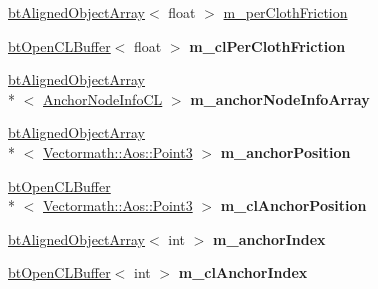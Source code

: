 \begin{DoxyCompactItemize}
\item 
\hyperlink{classbt_aligned_object_array}{bt\+Aligned\+Object\+Array}$<$ float $>$ \hyperlink{classbt_open_c_l_soft_body_solver_a87f860267322b4f1e0c113b4c9ff49e8}{m\+\_\+per\+Cloth\+Friction}
\item 
\hypertarget{classbt_open_c_l_soft_body_solver_afe0dc33619b6bb96b6bdc21266502599}{\hyperlink{classbt_open_c_l_buffer}{bt\+Open\+C\+L\+Buffer}$<$ float $>$ {\bfseries m\+\_\+cl\+Per\+Cloth\+Friction}}\label{classbt_open_c_l_soft_body_solver_afe0dc33619b6bb96b6bdc21266502599}

\item 
\hypertarget{classbt_open_c_l_soft_body_solver_a0f13ed90a848c69076f5a6f9db51dd85}{\hyperlink{classbt_aligned_object_array}{bt\+Aligned\+Object\+Array}\\*
$<$ \hyperlink{structbt_open_c_l_soft_body_solver_1_1_anchor_node_info_c_l}{Anchor\+Node\+Info\+C\+L} $>$ {\bfseries m\+\_\+anchor\+Node\+Info\+Array}}\label{classbt_open_c_l_soft_body_solver_a0f13ed90a848c69076f5a6f9db51dd85}

\item 
\hypertarget{classbt_open_c_l_soft_body_solver_a6ec77fb7cef7cca1cd63e14c81a84de4}{\hyperlink{classbt_aligned_object_array}{bt\+Aligned\+Object\+Array}\\*
$<$ \hyperlink{class_vectormath_1_1_aos_1_1_point3}{Vectormath\+::\+Aos\+::\+Point3} $>$ {\bfseries m\+\_\+anchor\+Position}}\label{classbt_open_c_l_soft_body_solver_a6ec77fb7cef7cca1cd63e14c81a84de4}

\item 
\hypertarget{classbt_open_c_l_soft_body_solver_a66dcf5991a63cae3c3deb8e77b49b755}{\hyperlink{classbt_open_c_l_buffer}{bt\+Open\+C\+L\+Buffer}\\*
$<$ \hyperlink{class_vectormath_1_1_aos_1_1_point3}{Vectormath\+::\+Aos\+::\+Point3} $>$ {\bfseries m\+\_\+cl\+Anchor\+Position}}\label{classbt_open_c_l_soft_body_solver_a66dcf5991a63cae3c3deb8e77b49b755}

\item 
\hypertarget{classbt_open_c_l_soft_body_solver_a2910b9e93b5b14cffb4ffa985955e73e}{\hyperlink{classbt_aligned_object_array}{bt\+Aligned\+Object\+Array}$<$ int $>$ {\bfseries m\+\_\+anchor\+Index}}\label{classbt_open_c_l_soft_body_solver_a2910b9e93b5b14cffb4ffa985955e73e}

\item 
\hypertarget{classbt_open_c_l_soft_body_solver_a903edb21e956448eb2b3b1d336c519a7}{\hyperlink{classbt_open_c_l_buffer}{bt\+Open\+C\+L\+Buffer}$<$ int $>$ {\bfseries m\+\_\+cl\+Anchor\+Index}}\label{classbt_open_c_l_soft_body_solver_a903edb21e956448eb2b3b1d336c519a7}


\end{DoxyCompactItemize}
